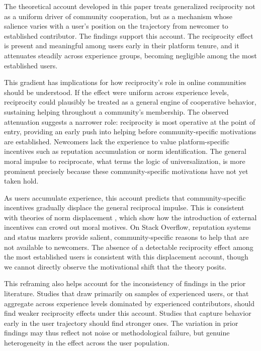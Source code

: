 The theoretical account developed in this paper treats generalized reciprocity not as a uniform driver of community cooperation, but as a mechanism whose salience varies with a user's position on the trajectory from newcomer to established contributor. The findings support this account. The reciprocity effect is present and meaningful among users early in their platform tenure, and it attenuates steadily across experience groups, becoming negligible among the most established users.

This gradient has implications for how reciprocity's role in online communities should be understood. If the effect were uniform across experience levels, reciprocity could plausibly be treated as a general engine of cooperative behavior, sustaining helping throughout a community's membership. The observed attenuation suggests a narrower role: reciprocity is most operative at the point of entry, providing an early push into helping before community-specific motivations are established. Newcomers lack the experience to value platform-specific incentives such as reputation accumulation or norm identification. The general moral impulse to reciprocate, what \citet{levine_logic_2020} terms the logic of universalization, is more prominent precisely because these community-specific motivations have not yet taken hold.

As users accumulate experience, this account predicts that community-specific incentives gradually displace the general reciprocal impulse. This is consistent with theories of norm displacement \citep{benabou_incentives_2006}, which show how the introduction of external incentives can crowd out moral motives. On Stack Overflow, reputation systems and status markers provide salient, community-specific reasons to help that are not available to newcomers. The absence of a detectable reciprocity effect among the most established users is consistent with this displacement account, though we cannot directly observe the motivational shift that the theory posits.

This reframing also helps account for the inconsistency of findings in the prior literature. Studies that draw primarily on samples of experienced users, or that aggregate across experience levels dominated by experienced contributors, should find weaker reciprocity effects under this account. Studies that capture behavior early in the user trajectory should find stronger ones. The variation in prior findings may thus reflect not noise or methodological failure, but genuine 
heterogeneity in the effect across the user population.

